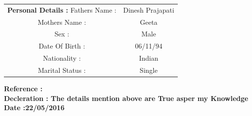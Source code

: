 \documentclass[a4paper]{article}
\begin{document}
\begin{flushleft}
\begin{tabular}{ cc }
\textbf {Personal Details :  }
 \hfill Fathers Name : & Dinesh Prajapati  \\ 
 \hfill Mothers Name : & Geeta \\  
 \hfill Sex : & Male   \\ 
 \hfill Date Of Birth : & 06/11/94  \\
 \hfill Nationality : & Indian  \\
 \hfill Marital Status : & Single
\end{tabular}
\end{flushleft}


\begin{flushleft}
\textbf {Reference :  }\\
\textbf {Decleration : The details mention above are True asper my Knowledge   }\\
\textbf {Date :22/05/2016  }
\end{flushleft}
\end{document}

